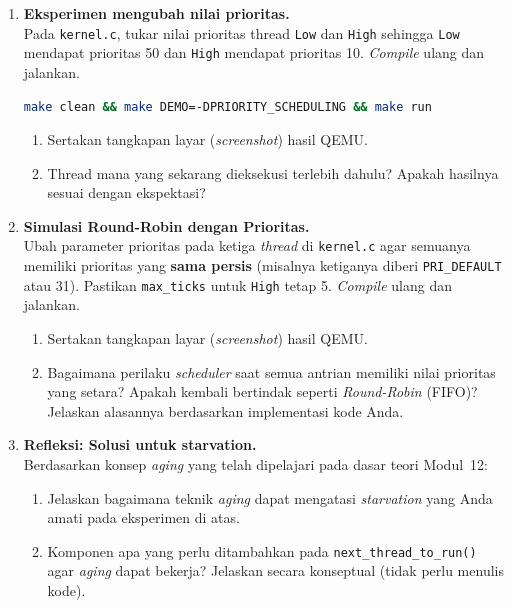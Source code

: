 \begin{enumerate}

	\item \textbf{Eksperimen mengubah nilai prioritas.}\\
	      Pada \texttt{kernel.c}, tukar nilai prioritas thread \texttt{Low} dan \texttt{High} sehingga \texttt{Low} mendapat prioritas 50 dan \texttt{High} mendapat prioritas 10. \textit{Compile} ulang dan jalankan.

	      \begin{lstlisting}[language=bash, caption={Kompilasi untuk eksperimen tukar prioritas}]
make clean && make DEMO=-DPRIORITY_SCHEDULING && make run
    \end{lstlisting}

	      \begin{enumerate}
		      \item[(a)] Sertakan tangkapan layar (\textit{screenshot}) hasil QEMU.


		      \item[(b)] Thread mana yang sekarang dieksekusi terlebih dahulu? Apakah hasilnya sesuai dengan ekspektasi?
	      \end{enumerate}

	\item \textbf{Simulasi Round-Robin dengan Prioritas.}\\
	      Ubah parameter prioritas pada ketiga \textit{thread} di \texttt{kernel.c} agar semuanya memiliki prioritas yang \textbf{sama persis} (misalnya ketiganya diberi \texttt{PRI\_DEFAULT} atau 31). Pastikan \texttt{max\_ticks} untuk \texttt{High} tetap 5. \textit{Compile} ulang dan jalankan.

	      \begin{enumerate}
		      \item[(a)] Sertakan tangkapan layar (\textit{screenshot}) hasil QEMU.


		      \item[(b)] Bagaimana perilaku \textit{scheduler} saat semua antrian memiliki nilai prioritas yang setara? Apakah kembali bertindak seperti \textit{Round-Robin} (FIFO)? Jelaskan alasannya berdasarkan implementasi kode Anda.
	      \end{enumerate}

	\item \textbf{Refleksi: Solusi untuk starvation.}\\
	      Berdasarkan konsep \textit{aging} yang telah dipelajari pada dasar teori Modul~12:
	      \begin{enumerate}
		      \item[(a)] Jelaskan bagaimana teknik \textit{aging} dapat mengatasi \textit{starvation} yang Anda amati pada eksperimen di atas.
		      \item[(b)] Komponen apa yang perlu ditambahkan pada \texttt{next\_thread\_to\_run()} agar \textit{aging} dapat bekerja? Jelaskan secara konseptual (tidak perlu menulis kode).
	      \end{enumerate}

\end{enumerate}
